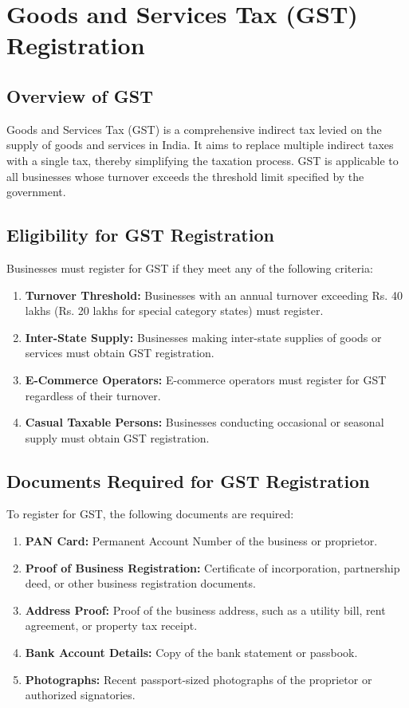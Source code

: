 \documentclass[a4paper,12pt]{report}
\begin{document}
\chapter{Goods and Services Tax (GST) Registration}
\section{Overview of GST}
Goods and Services Tax (GST) is a comprehensive indirect tax levied on the supply of goods and services in India. It aims to replace multiple indirect taxes with a single tax, thereby simplifying the taxation process. GST is applicable to all businesses whose turnover exceeds the threshold limit specified by the government.

\section{Eligibility for GST Registration}
Businesses must register for GST if they meet any of the following criteria:
\begin{enumerate}
    \item \textbf{Turnover Threshold:} Businesses with an annual turnover exceeding Rs. 40 lakhs (Rs. 20 lakhs for special category states) must register.
    \item \textbf{Inter-State Supply:} Businesses making inter-state supplies of goods or services must obtain GST registration.
    \item \textbf{E-Commerce Operators:} E-commerce operators must register for GST regardless of their turnover.
    \item \textbf{Casual Taxable Persons:} Businesses conducting occasional or seasonal supply must obtain GST registration.
\end{enumerate}

\section{Documents Required for GST Registration}
To register for GST, the following documents are required:
\begin{enumerate}
    \item \textbf{PAN Card:} Permanent Account Number of the business or proprietor.
    \item \textbf{Proof of Business Registration:} Certificate of incorporation, partnership deed, or other business registration documents.
    \item \textbf{Address Proof:} Proof of the business address, such as a utility bill, rent agreement, or property tax receipt.
    \item \textbf{Bank Account Details:} Copy of the bank statement or passbook.
    \item \textbf{Photographs:} Recent passport-sized photographs of the proprietor or authorized signatories.
\end{enumerate}
\end{document}
